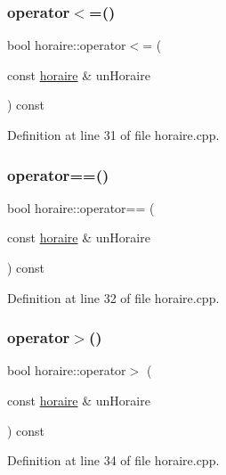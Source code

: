\subsubsection{\texorpdfstring{operator$<$=()}{operator<=()}}
{\footnotesize\ttfamily bool horaire\+::operator$<$= (\begin{DoxyParamCaption}\item[{const \hyperlink{classhoraire}{horaire} \&}]{un\+Horaire }\end{DoxyParamCaption}) const}



Definition at line 31 of file horaire.\+cpp.

\hypertarget{classhoraire_ad6f3361000d688c897eb79a260fc52c8}{}\label{classhoraire_ad6f3361000d688c897eb79a260fc52c8} 
\subsubsection{\texorpdfstring{operator==()}{operator==()}}
{\footnotesize\ttfamily bool horaire\+::operator== (\begin{DoxyParamCaption}\item[{const \hyperlink{classhoraire}{horaire} \&}]{un\+Horaire }\end{DoxyParamCaption}) const}



Definition at line 32 of file horaire.\+cpp.

\hypertarget{classhoraire_aa7d498b4f60474ed5ebb62bcd02cd869}{}\label{classhoraire_aa7d498b4f60474ed5ebb62bcd02cd869} 
\subsubsection{\texorpdfstring{operator$>$()}{operator>()}}
{\footnotesize\ttfamily bool horaire\+::operator$>$ (\begin{DoxyParamCaption}\item[{const \hyperlink{classhoraire}{horaire} \&}]{un\+Horaire }\end{DoxyParamCaption}) const}



Definition at line 34 of file horaire.\+cpp.

\hypertarget{classhoraire_ab8bdbbb3d453f6c470c6e3b6110342e2}{}\label{classhoraire_ab8bdbbb3d453f6c470c6e3b6110342e2} 
